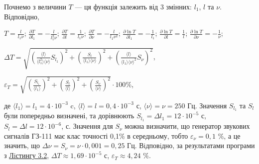 \documentclass[12pt,a4paper]{article}
\begin{document}
    \vspace{1em} %

    Почнемо з величини $T$ --- ця функція залежить від 3 змінних: $l_1$, $l$ та $\nu$. Відповідно,

    \begin{center}

        $\displaystyle T = \frac{l}{l_1 \nu}$; $\displaystyle \frac{\partial T}{\partial l_1} = -\frac{l}{l_1^2 \nu}$; $\displaystyle \frac{\partial T}{\partial l} = \frac{1}{l_1 \nu}$; $\displaystyle \frac{\partial T}{\partial \nu} = -\frac{l}{l_1 \nu^2}$;
        $\displaystyle \frac{\partial \ln T}{\partial l_1} = -\frac{1}{l_1}$; $\displaystyle \frac{\partial \ln T}{\partial l} = \frac{1}{l}$; $\displaystyle \frac{\partial \ln T}{\partial \nu} = -\frac{1}{\nu}$;

    \end{center}

    \begin{center}

        $\displaystyle \Delta T = \sqrt{\left( \frac{\text{⟨}l\text{⟩}}{\text{⟨}l_1^2\text{⟩} \text{⟨}\nu\text{⟩}} S_{l_1} \right)^2 + \left( \frac{S_l}{\text{⟨}l_1\text{⟩} \text{⟨}\nu\text{⟩}} \right)^2 + \left(\frac{\text{⟨}l\text{⟩}}{\text{⟨}l_1\text{⟩} \text{⟨}\nu\text{⟩}^2} S_{\nu}  \right)^2}$,

    \end{center}

    \begin{center}

        $\displaystyle \varepsilon_T = \sqrt{\left( \frac{S_{l_1}}{\text{⟨}l_1\text{⟩}} \right)^2 + \left( \frac{S_l}{\text{⟨}l\text{⟩}} \right)^2 + \left( \frac{S_{\nu }}{\text{⟨}\nu \text{⟩}} \right)^2} \cdot 100 \%$,

    \end{center}

    де $\text{⟨}l_1\text{⟩} = l_1 = 4 \cdot 10^{-3}$ c, $\text{⟨}l\text{⟩} = l = 0,4 \cdot 10^{-3}$ с, $\text{⟨}\nu\text{⟩} = \nu = 250$ Гц. Значення $S_{l_1}$ та $S_l$ були попередньо визначені, та дорівнюють $S_{l_1} = \Delta l_1 = 12 \cdot 10^{-5}$ с, $S_l = \Delta l = 12 \cdot 10^{-6}$, с.
    Значення для $S_{\nu}$ можна визначити, що генератор звукових сигналів ГЗ-111 має клас точності 0,1\% в середньому, тобто $\varepsilon_{\nu} = 0,1$ \%, а це значить, що $\Delta \nu = S_{\nu} = \nu \cdot 0,001 = 0,25$ Гц.
    Вiдповiдно, за результатами програми з \hyperlink{listing2}{Лiстингу 3.2}, $\Delta T \approx 1,69 \cdot 10^{-5}$ с, $\varepsilon_T \approx 4,24$ \%.
\end{document}
